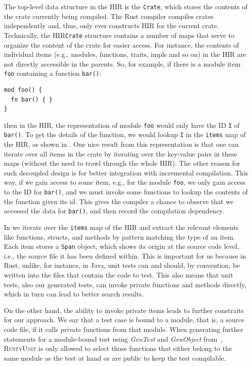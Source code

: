 \documentclass[paper=a4,%
  twoside,%
  BCOR4mm,%
  abstract=true,%
  toc=bibliography,%
  chapterprefix=true,%
  toc=bibliographynumbered,%
  open=right,%
  english,%
  pagesize=pdftex]{scrreprt}
\newcommand{\tech}{\textsc{RustyUnit}\xspace}
\newcommand{\hir}{\ac{HIR}\xspace}
\begin{document}
The top-level data structure in the \hir is the \texttt{Crate}, which stores the contents of the crate currently being compiled. The Rust compiler compiles crates independently and, thus, only ever constructs \hir for the current crate. Technically, the \hir \texttt{Crate} structure contains a number of maps that serve to organize the content of the crate for easier access. For instance, the contents of individual items (e.g., modules, functions, traits, impls and so on) in the \hir are not directly accessible in the parents. So, for example, if there is a module item \texttt{foo} containing a function \texttt{bar()}:

\begin{lstlisting}[style=boxed, caption={}]
mod foo() {
  fn bar() { }
}
\end{lstlisting}
then in the \hir, the representation of module \texttt{foo} would only have the ID \texttt{I} of \texttt{bar()}. To get the details of the function, we would lookup \texttt{I} in the \texttt{items} map of the \hir, as shown in . One nice result from this representation is that one can iterate over all items in the crate by iterating over the key-value pairs in these maps (without the need to trawl through the whole \hir). The other reason for such decoupled design is for better integration with incremental compilation. This way, if we gain access to some item, e.g., for the module \texttt{foo}, we only gain access to the ID for \texttt{bar()}, and we must invoke some functions to lookup the contents of the function given its id. This gives the compiler a chance to observe that we accessed the data for \texttt{bar()}, and then record the compilation dependency.

In  we iterate over the \texttt{items} map of the \hir and extract the relevant elements like functions, structs, and methods by pattern matching the type of an item. Each item stores a \texttt{Span} object, which shows its origin at the source code level, i.e., the source file it has been defined within. This is important for us because in Rust, unlike, for instance, in Java, unit tests can and should, by convention, be written into the files that contain the code to test. This also means that unit tests, also our generated tests, can invoke private functions and methods directly, which in turn can lead to better search results.

On the other hand, the ability to invoke private items leads to further constraits for our approach. We say that a test case is bound to a module, that is, a source code file, if it calls private functions from that module. When generating further statements for a module-bound test using \emph{GenTest} and \emph{GenObject} from~, \tech is only allowed to select those functions that either belong to the same module as the test at hand or are public to keep the test compilable.
\end{document}
